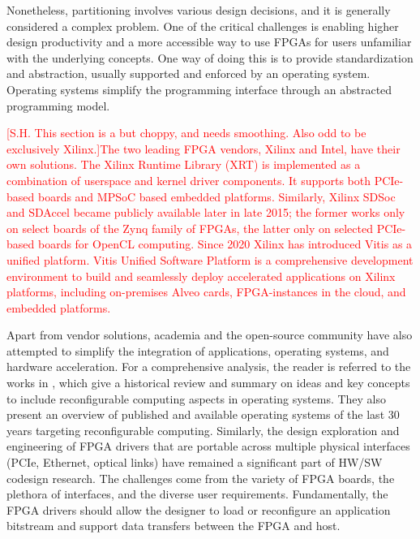 Nonetheless, partitioning involves various design decisions, and it is generally considered a complex problem. One of the critical challenges is enabling higher design productivity and a more accessible way to use FPGAs for users unfamiliar with the underlying concepts. One way of doing this is to provide standardization and abstraction, usually supported and enforced by an operating system. Operating systems simplify the programming interface through an abstracted programming model.

\textcolor{red}{[S.H. This section is a but choppy, and needs smoothing.  Also odd to be exclusively Xilinx.]The two leading FPGA vendors, Xilinx and Intel, have their own solutions. The Xilinx Runtime Library (XRT) \cite{XRT} is implemented as a combination of userspace and kernel driver components. It supports both PCIe-based boards and MPSoC based embedded platforms. Similarly, Xilinx SDSoc \cite{sdsoc} and SDAccel \cite{sdaccel} became publicly available later in late 2015; the former works only on select boards of the Zynq family of FPGAs, the latter only on selected PCIe-based boards for OpenCL computing. Since 2020 Xilinx has introduced Vitis \cite{vitis} as a unified platform. Vitis Unified Software Platform is a comprehensive development environment to build and seamlessly deploy accelerated applications on Xilinx platforms, including on-premises Alveo cards, FPGA-instances in the cloud, and embedded platforms.}

Apart from vendor solutions, academia and the open-source community have also attempted to simplify the integration of applications, operating systems, and hardware acceleration. For a comprehensive analysis, the reader is referred to the works in \cite{reconfig_os, connectal}, which give a historical review and summary on ideas and key concepts to include reconfigurable computing aspects in operating systems. They also present an overview of published and available operating systems of the last 30 years targeting reconfigurable computing. Similarly, the design exploration and engineering of FPGA drivers that are portable across multiple physical interfaces (PCIe, Ethernet, optical links) have remained a significant part of HW/SW codesign research. The challenges come from the variety of FPGA boards, the plethora of interfaces, and the diverse user requirements. Fundamentally, the FPGA drivers should allow the designer to load or reconfigure an application bitstream and support data transfers between the FPGA and host.

